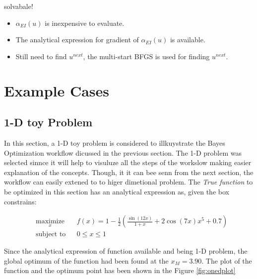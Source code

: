 \documentclass[]{elsarticle} %
\providecommand{\tightlist}{%
  \setlength{\itemsep}{0pt}\setlength{\parskip}{0pt}}
\begin{document}
solvabale!

\begin{itemize}
\tightlist
\item
  \(\alpha_{EI}(u)\) is inexpensive to evaluate.
\item
  The analytical expression for gradient of \(\alpha_{EI}(u)\) is
  available.
\item
  Still need to find \(u^{next}\), the multi-start BFGS is used for
  finding \(u^{next}\).
\end{itemize}

\newpage

\hypertarget{example-cases}{%
\section{Example Cases}\label{example-cases}}

\hypertarget{d-toy-problem}{%
\subsection{1-D toy Problem}\label{d-toy-problem}}

In this section, a 1-D toy problem is considered to illkuystrate the Bayes Optimization workflow dicussed in the previous section. The 1-D problem was selected sinnce it will help to visuluze all the steps of the workslow making easier explanation of the concepts. Though, it it can bee senn from the next section, the workflow can easily extened to to higer dimetional problem. The \emph{True function} to be optimized in this section has an analytical expression as, given the box constrains:

\begin{equation}
\begin{aligned}
& \underset{x}{\text{maximize}}
& & f(x) = 1-\frac{1}{2}(\frac{\sin (12x)}{1+x} + 2\cos(7x)x^5 + 0.7)  \\
& \text{subject to}
& & 0 \leq x \leq 1
\end{aligned}
\label{eq:1deq}
\end{equation}

Since the analytical expression of function available and being 1-D problem, the global optimum of the function had been found at the \(x_M = 3.90\). The plot of the function and the optimum point has been shown in the Figure \ref{fig:onedplot}
\end{document}
